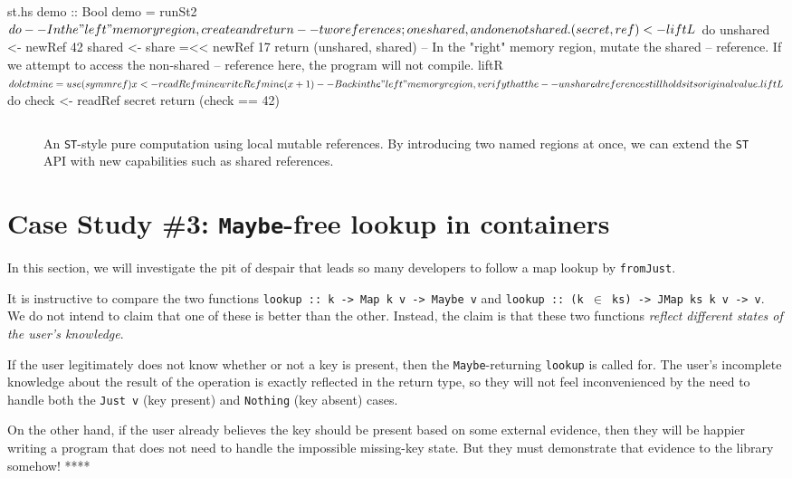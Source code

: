\documentclass[format=sigplan, review=false, screen=true]{acmart}
\begin{document}
\begin{filecontents*}{st.hs}
demo :: Bool
demo = runSt2 $ do
  -- In the "left" memory region, create and return
  -- two references; one shared, and one not shared.
  (secret, ref) <- liftL $ do
      unshared <- newRef 42
      shared   <- share =<< newRef 17
      return (unshared, shared)
  -- In the "right" memory region, mutate the shared
  -- reference. If we attempt to access the non-shared
  -- reference here, the program will not compile.
  liftR $ do
      let mine = use (symm ref)
      x <- readRef mine
      writeRef mine (x + 1)
  -- Back in the "left" memory region, verify that the
  -- unshared reference still holds its original value.
  liftL $ do
      check <- readRef secret
      return (check == 42)
\end{filecontents*}

\begin{figure}
  \inputminted{haskell}{st.hs}
  \caption{An \texttt{ST}-style pure computation using local mutable
    references. By introducing two named regions at once, we can extend
    the \texttt{ST} API with new capabilities such as shared references.\label{st-example}}
\end{figure}

\section{Case Study \#3: \texttt{Maybe}-free lookup in containers}

In this section, we will investigate the pit of despair that leads so
many developers to follow a map lookup by \texttt{fromJust}.

It is instructive to compare the two functions \texttt{lookup :: k -> Map k v -> Maybe v}
and \texttt{lookup :: (k $\in$ ks) -> JMap ks k v -> v}. We do not intend to claim that
one of these is better than the other. Instead, the claim is that these two functions
\emph{reflect different states of the user's knowledge}.

If the user legitimately does not know whether or not a key is present, then the
\texttt{Maybe}-returning \texttt{lookup} is called for. The user's incomplete knowledge
about the result of the operation is exactly reflected in the return type, so they will
not feel inconvenienced by the need to handle both the \texttt{Just v} (key present)
and \texttt{Nothing} (key absent) cases.

On the other hand, if the user already believes the key should be present based on some
external evidence, then they will be happier writing a program that does not need to handle
the impossible missing-key state. But they must demonstrate that evidence to the library
somehow!  ****
\end{document}
